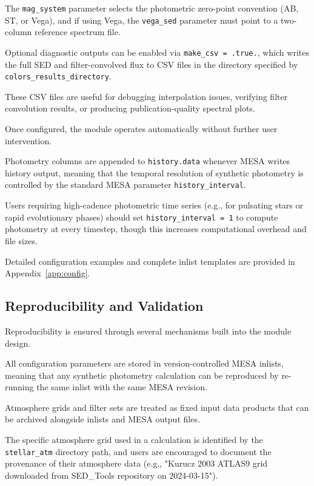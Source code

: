 \documentclass[linenumbers,apj,twocolumn, floatfix]{aastex701} \usepackage{amsmath} \usepackage{longtable} \usepackage{graphicx} \usepackage{ulem} \usepackage{xcolor} \usepackage{lettrine} \usepackage{yfonts} \usepackage{rotating}
\begin{document}
The \texttt{mag\_system} parameter selects the photometric zero-point convention (AB, ST, or Vega), and if using Vega, the \texttt{vega\_sed} parameter must point to a two-column reference spectrum file.

Optional diagnostic outputs can be enabled via \texttt{make\_csv = .true.}, which writes the full SED and filter-convolved flux to CSV files in the directory specified by \texttt{colors\_results\_directory}.

These CSV files are useful for debugging interpolation issues, verifying filter convolution results, or producing publication-quality spectral plots.

Once configured, the module operates automatically without further user intervention.

Photometry columns are appended to \texttt{history.data} whenever MESA writes history output, meaning that the temporal resolution of synthetic photometry is controlled by the standard MESA parameter \texttt{history\_interval}.

Users requiring high-cadence photometric time series (e.g., for pulsating stars or rapid evolutionary phases) should set \texttt{history\_interval = 1} to compute photometry at every timestep, though this increases computational overhead and file sizes.

Detailed configuration examples and complete inlist templates are provided in Appendix~\ref{app:config}.

\subsection{Reproducibility and Validation}
\label{sec:reproducibility}

Reproducibility is ensured through several mechanisms built into the module design.

All configuration parameters are stored in version-controlled MESA inlists, meaning that any synthetic photometry calculation can be reproduced by re-running the same inlist with the same MESA revision.

Atmosphere grids and filter sets are treated as fixed input data products that can be archived alongside inlists and MESA output files.

The specific atmosphere grid used in a calculation is identified by the \texttt{stellar\_atm} directory path, and users are encouraged to document the provenance of their atmosphere data (e.g., "Kurucz 2003 ATLAS9 grid downloaded from SED\_Tools repository on 2024-03-15").
\end{document}
